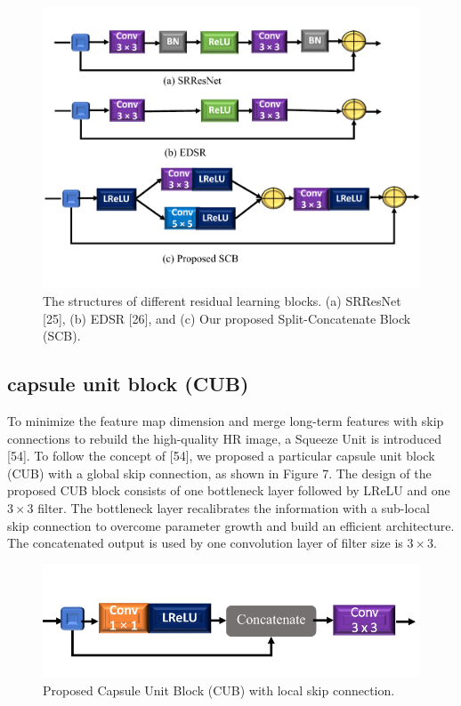 \documentclass{ieeeaccess}
\begin{document}
\begin{figure}[ht]
  \includegraphics[width=\linewidth]{6FIGURE.pdf}
  \caption{The structures of different residual learning blocks. (a) SRResNet [25], (b) EDSR [26], and (c) Our proposed Split-Concatenate Block (SCB).}
  \label{fig:7}
\end{figure}



\subsection{capsule unit block (CUB)}
To minimize the feature map dimension and merge long-term features with skip connections to rebuild the high-quality HR image, a Squeeze Unit is introduced [54]. To follow the concept of [54], we proposed a particular capsule unit block (CUB) with a global skip connection, as shown in Figure 7. The design of the proposed CUB block consists of one bottleneck layer followed by LReLU and one $3\times3$ filter. The bottleneck layer recalibrates the information with a sub-local skip connection to overcome parameter growth and build an efficient architecture. The concatenated output is used by one convolution layer of filter size is $3\times3$.


\begin{figure}[ht]
  \includegraphics[width=\linewidth]{7FIGURE.pdf}
  \caption{Proposed Capsule Unit Block (CUB) with local skip connection.}
  \label{fig:7}
\end{figure}
\end{document}
